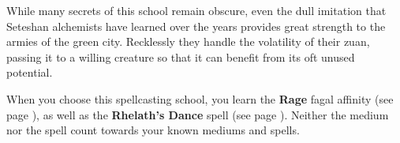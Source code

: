     While many secrets of this school remain obscure, even the dull imitation that Seteshan alchemists have learned over the years provides great strength to the armies of the green city.
    Recklessly they handle the volatility of their zuan, passing it to a willing creature so that it can benefit from its oft unused potential.

    When you choose this spellcasting school, you learn the \textbf{Rage} fagal affinity (see page \pageref{medium::rage}), as well as the \textbf{Rhelath's Dance} spell (see page \pageref{spell::rhelathsdance}).
    Neither the medium nor the spell count towards your known mediums and spells.

\newpage
